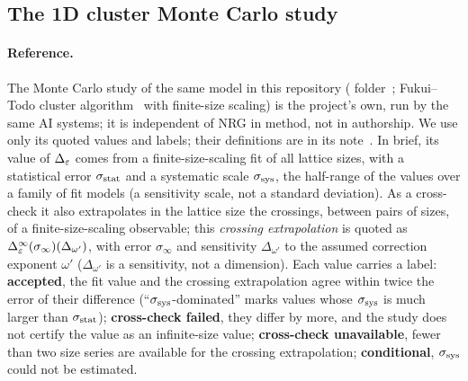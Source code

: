 \subsection{The 1D cluster Monte Carlo study}\label{nrg:sec:mc}
\paragraph{Reference.} The Monte Carlo study of the same model in this repository ( folder~\cite{nrg:MCnote}; Fukui--Todo
cluster algorithm~\cite{nrg:FukuiTodo2009,nrg:LB95} with finite-size scaling) is the project's own, run by the same AI systems; it is
independent of NRG in method, not in authorship. We use only its quoted values and labels; their definitions are in its
note~\cite{nrg:MCnote}. In brief, its value of $\Delta_\varepsilon$ comes from a finite-size-scaling fit of all lattice sizes, with a statistical error
$\sigma_{\rm stat}$ and a systematic scale $\sigma_{\rm sys}$, the half-range of the values over a family of fit models (a sensitivity
scale, not a standard deviation). As a cross-check it also extrapolates in the lattice size the crossings, between pairs of sizes, of a
finite-size-scaling observable; this \emph{crossing extrapolation} is quoted as $\Delta_\varepsilon^\infty(\sigma_\infty)(\Delta_{\omega'})$, with
error $\sigma_\infty$ and sensitivity $\Delta_{\omega'}$ to the assumed correction exponent $\omega'$ ($\Delta_{\omega'}$ is a
sensitivity, not a dimension). Each value carries a label: \textbf{accepted}, the fit value and the crossing extrapolation agree within
twice the error of their difference (``$\sigma_{\rm sys}$-dominated'' marks values whose $\sigma_{\rm sys}$ is much larger than
$\sigma_{\rm stat}$); \textbf{cross-check failed}, they differ by more, and the study does not certify the value as an infinite-size
value; \textbf{cross-check unavailable}, fewer than two size series are available for the crossing extrapolation; \textbf{conditional},
$\sigma_{\rm sys}$ could not be estimated.


